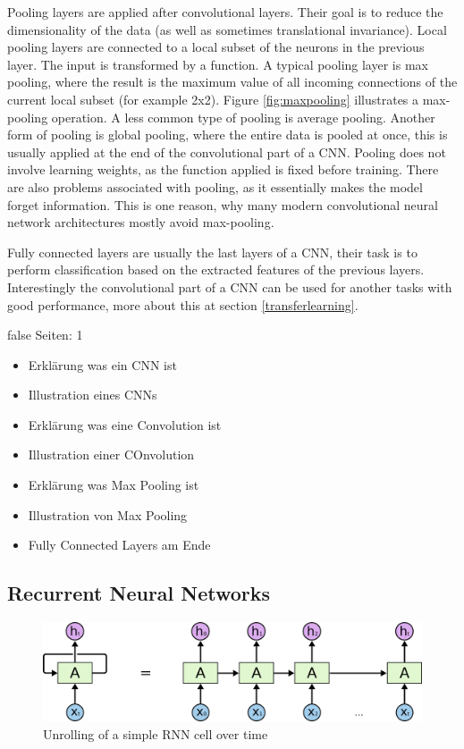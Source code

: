 \documentclass[draft,final,oneside]{vutinfth} %
\begin{document}
Pooling layers are applied after convolutional layers. Their goal is to reduce the dimensionality of the data (as well as sometimes translational invariance). Local pooling layers are connected to a local subset of the neurons in the previous layer. The input is transformed by a function. A typical pooling layer is max pooling, where the result is the maximum value of all incoming connections of the current local subset (for example 2x2). Figure \ref{fig:maxpooling} illustrates a max-pooling operation. A less common type of pooling is average pooling. Another form of pooling is global pooling, where the entire data is pooled at once, this is usually applied at the end of the convolutional part of a CNN. Pooling does not involve learning weights, as the function applied is fixed before training. There are also problems associated with pooling, as it essentially makes the model forget information. This is one reason, why many modern convolutional neural network architectures mostly avoid max-pooling. \cite{resnet}

Fully connected layers are usually the last layers of a CNN, their task is to perform classification based on the extracted features of the previous layers. Interestingly the convolutional part of a CNN can be used for another tasks with good performance, more about this at section \ref{transferlearning}.

\if false
Seiten: 1
\begin{itemize}

\item Erklärung was ein CNN ist
\item Illustration eines CNNs
\item Erklärung was eine Convolution ist
\item Illustration einer COnvolution
\item Erklärung was Max Pooling ist
\item Illustration von Max Pooling
\item Fully Connected Layers am Ende


\end{itemize}
\fi

\subsection{Recurrent Neural Networks} \label{lstmbackground}

\begin{figure}[ht]
	\centering
  	\includegraphics[width=1.0\textwidth]{graphics/rnn.png}
	\caption{Unrolling of a simple RNN cell over time \cite{colahlstm}}
	\label{fig:rnn}
\end{figure}
\end{document}
